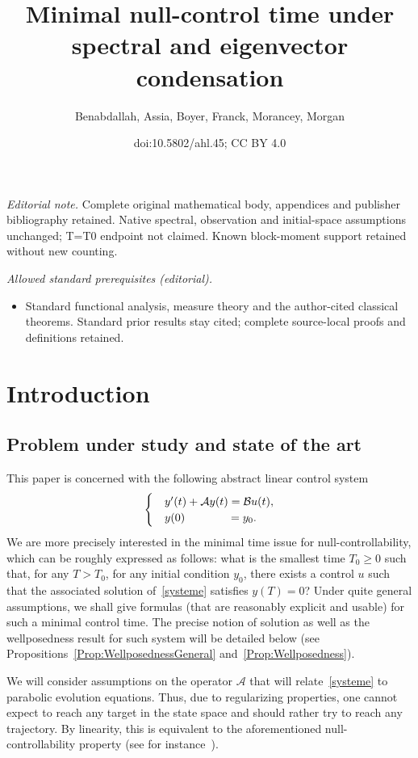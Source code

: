 \documentclass[10pt]{amsart}
\title{Minimal null-control time under spectral and eigenvector condensation}
\author{Benabdallah, Assia, Boyer, Franck, Morancey, Morgan}
\date{doi:10.5802/ahl.45; CC BY 4.0}
\theoremstyle{definition}\newtheorem{defi}[theo]{Definition}\newtheorem{rema}[theo]{Remark}\newtheorem{exam}[theo]{Example}\newtheorem{exem}[theo]{Example}\newtheorem{nota}[theo]{Notation}
\newcommand\A{\mathcal{A}}
\newcommand\B{\mathcal{B}}
\begin{document}
\maketitle
\noindent\textit{Editorial note.} Complete original mathematical body, appendices and publisher bibliography retained. Native spectral, observation and initial-space assumptions unchanged; T=T0 endpoint not claimed. Known block-moment support retained without new counting.\par\medskip
\noindent\textit{Allowed standard prerequisites (editorial).}\begin{itemize}
\item Standard functional analysis, measure theory and the author-cited classical theorems. Standard prior results stay cited; complete source-local proofs and definitions retained.
\end{itemize}\medskip



\section{Introduction}

\subsection{Problem under study and state of the art}


This paper is concerned with the following abstract linear control system
\begin{equation}\label{systeme}
\begin{cases}
&y'(t) + \A y(t) = \B u(t),
\\
&y(0) \mkern68mu= y_0.
\end{cases}
\end{equation}
We are more precisely interested in the minimal time issue for null-controllability, which can be roughly expressed as follows: what is the smallest time $T_0 \geq0$ such that, for any $T > T_0$, for any initial condition $y_0$, there exists a control $u$ such that the associated solution of~\eqref{systeme} satisfies $y(T)=0$? Under quite general assumptions, we shall give formulas (that are reasonably explicit and usable) for such a minimal control time. The precise notion of solution as well as the wellposedness result for such system will be detailed below (see Propositions~\ref{Prop:WellposednessGeneral} and~\ref{Prop:Wellposedness}).

We will consider assumptions on the operator $\A$ that will relate~\eqref{systeme} to parabolic evolution equations. Thus, due to regularizing properties, one cannot expect to reach any target in the state space and should rather try to reach any trajectory. By linearity, this is equivalent to the aforementioned null-controllability property (see for instance~\cite[Sections.~2.3 and~2.5]{CoronBook}).
\end{document}
